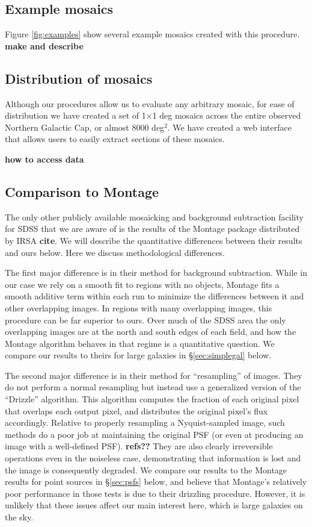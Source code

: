 \documentclass[10pt,preprint]{aastex}
\begin{document}
\subsection{Example mosaics}

Figure \ref{fig:examples} show several example mosaics created with
this procedure.  {\bf make and describe}

\subsection{Distribution of mosaics}

Although our procedures allow us to evaluate any arbitrary mosaic, for
ease of distribution we have created a set of 1$\times$1 deg mosaics
across the entire observed Northern Galactic Cap, or almost 8000
deg$^2$. We have created a web interface that allows users to easily
extract sections of these mosaics.

{\bf how to access data}

\subsection{Comparison to Montage} 

The only other publicly available mosaicking and background
subtraction facility for SDSS that we are aware of is the results of
the Montage package distributed by IRSA {\bf cite}. We will describe
the quantitative differences between their results and ours below.
Here we discuss methodological differences.

The first major difference is in their method for background
subtraction. While in our case we rely on a smooth fit to regions with
no objects, Montage fits a smooth additive term within each run to
minimize the differences between it and other overlapping images. In
regions with many overlapping images, this procedure can be far
superior to ours. Over much of the SDSS area the only overlapping
images are at the north and south edges of each field, and how the
Montage algorithm behaves in that regime is a quantitative
question. We compare our results to theirs for large galaxies in
\S\ref{sec:simplegal} below.

The second major difference is in their method for ``resampling'' of
images. They do not perform a normal resampling but instead use a
generalized version of the ``Drizzle'' algorithm. This algorithm
computes the fraction of each original pixel that overlaps each output
pixel, and distributes the original pixel's flux accordingly. Relative
to properly resampling a Nyquist-sampled image, such methods do a poor
job at maintaining the original PSF (or even at producing an image
with a well-defined PSF). {\bf refs??} They are also clearly
irreversible operations even in the noiseless case, demonstrating that
information is lost and the image is consequently degraded. We compare
our results to the Montage results for point sources in
\S\ref{sec:psfs} below, and believe that Montage's relatively poor
performance in those tests is due to their drizzling
procedure. However, it is unlikely that these issues affect our main
interest here, which is large galaxies on the sky.
\end{document}
